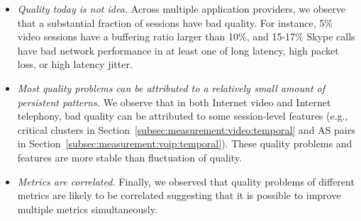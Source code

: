 \begin{itemize}

\item {\em Quality today is not idea.} 
Across multiple application providers, we observe 
that a substantial fraction of sessions have bad quality. 
For instance, 5\% video sessions have a
buffering ratio larger than 10\%, and 15-17\% Skype
calls have bad network performance in at least one
of long latency, high packet loss, or high latency jitter.

\item {\em Most quality problems can be attributed to 
a relatively small amount of persistent patterns.}
We observe that in both Internet video and Internet
telephony, bad quality can be attributed to some
session-level features (e.g., critical clusters in 
Section~\ref{subsec:measurement:video:temporal}
and AS pairs in 
Section~\ref{subsec:measurement:voip:temporal}).
These quality problems and features are more stable than 
fluctuation of quality.

\item {\em Metrics are correlated.} Finally, we observed that
quality problems of different metrics are likely to be correlated
suggesting that it is possible to improve multiple metrics 
simultaneously.

\end{itemize}





